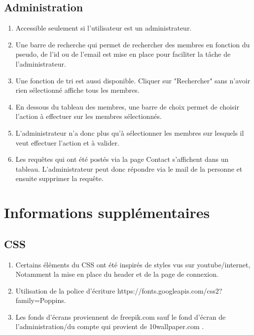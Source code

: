 \documentclass[12pt,a4paper]{article}
\begin{document}
\subsection{Administration}
\begin{enumerate}
    \item Accessible seulement si l'utilisateur est un administrateur.
    \item Une barre de recherche qui permet de rechercher des membres en fonction du pseudo, de l'id ou de l'email est mise en place pour faciliter la tâche de l'administrateur.
    \item Une fonction de tri est aussi disponible. Cliquer sur "Rechercher" sans n'avoir rien sélectionné affiche tous les membres.
    \item En dessous du tableau des membres, une barre de choix permet de choisir l'action à effectuer sur les membres sélectionnés.
    \item L'administrateur n'a donc plus qu'à sélectionner les membres sur lesquels il veut effectuer l'action et à valider.
    \item Les requêtes qui ont été postés via la page Contact s'affichent dans un tableau. L'administrateur peut donc répondre via le mail de la personne et ensuite supprimer la requête.
\end{enumerate}


\section{Informations supplémentaires}

\subsection{CSS}
\begin{enumerate}
    \item Certains éléments du CSS ont été inspirés de styles vus sur youtube/internet, Notamment la mise en place du header et de la page de connexion.
    \item Utilisation de la police d'écriture https://fonts.googleapis.com/css2?family=Poppins.
    \item Les fonds d'écrans proviennent de freepik.com sauf le fond d'écran de l'administration/du compte qui provient de 10wallpaper.com .
\end{enumerate}
\end{document}
